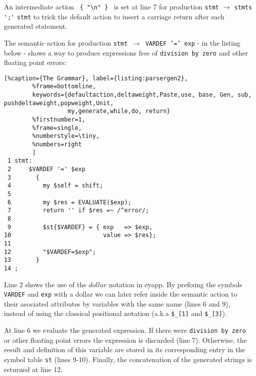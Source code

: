 An intermediate action \verb| { "\n" } | is set at line 7 
for production \verb|stmt| $\rightarrow$ \verb|stmts| \verb|';'| \verb|stmt|
to trick the default action to insert a carriage return 
after each generated statement.

The semantic action for production \mbox{\tt stmt $\rightarrow$ VARDEF '=' exp}
- in the listing below - shows a way to
produce expressions free of  {\tt division by zero} and other floating point 
errors:

\begin{lstlisting}[%caption={The Grammar}, label={listing:parsergen2}, 
        %frame=bottomline,
        keywords={defaultaction,deltaweight,Paste,use, base, Gen, sub, pushdeltaweight,popweight,Unit,
                  my,generate,while,do, return}
        %firstnumber=1, 
        %frame=single,
        %numberstyle=\tiny,
        %numbers=right
        ]
 1 stmt:
 2     $VARDEF '=' $exp  
 3       {
 4         my $self = shift;
 5 
 6         my $res = EVALUATE($exp);
 7         return '' if $res =~ /^error/;
 8 
 9         $st{$VARDEF} = { exp   => $exp, 
10                          value => $res};
11 
12         "$VARDEF=$exp";
13       }
14 ;
\end{lstlisting}

Line 2 shows the use of the $dollar$ notation in eyapp. By 
prefixing the symbols \verb|VARDEF| and \verb|exp|  
with a dollar we can later refer 
inside the semantic action to their asociated
attributes by variables with the same name (lines 6 and 9),
instead of using the classical positional notation (a.k.a 
\verb|$_[1]| and \verb|$_[3]|).

At line 6 we evaluate the generated expression.
If there were {\tt division by zero} or other floating point errors
the expression is discarded (line 7).
Otherwise, the result and definition 
of this variable are stored in its corresponding
entry in the symbol table \verb|st| (lines 9-10).
Finally, the concatenation of the generated strings 
is returned at line 12.

